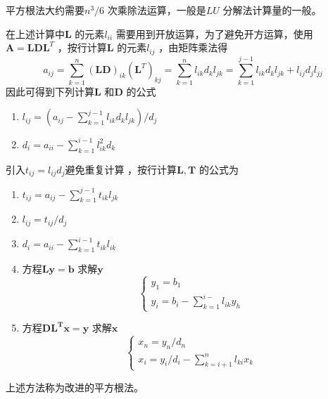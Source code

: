 \documentclass[a4paper]{article}
\begin{document}
平方根法大约需要$n^3 / 6$ 次乘除法运算，一般是$LU$ 分解法计算量的一般。

在上述计算中$\mathbf{L}$ 的元素$l_{ii}$ 需要用到开放运算，为了避免开方运算，使用$\mathbf{A}=\mathbf{LDL}^{T}$ ，按行计算$\mathbf{L}$ 的元素$l_{ij}$ ，由矩阵乘法得
\[
	a_{ij} = \sum_{k=1}^{n} (\mathbf{LD})_{ik} (\mathbf{L}^{T})_{kj} = \sum_{k=1}^{n} l_{ik} d_k l_{jk} = \sum_{k=1}^{j-1} l_{ik} d_k l_{jk} + l_{ij} d_j l_{jj}
\] 
因此可得到下列计算$\mathbf{L}$ 和$\mathbf{D}$ 的公式
\begin{enumerate}
	\item $l_{ij} = (a_{ij} - \sum_{k=1}^{j-1} l_{ik} d_k l_{jk}) / d_j$
	\item $d_i = a_{ii} - \sum_{k=1}^{i-1} l_{ik}^2 d_k$
\end{enumerate}

引入$t_{ij} = l_{ij} d_j$避免重复计算 ，按行计算$\mathbf{L, T}$ 的公式为
\begin{enumerate}
	\item $t_{ij} = a_{ij} - \sum_{k=1}^{j-1} t_{ik} l_{jk}$ 
	\item $l_{ij} = t_{ij} / d_j$
	\item  $d_i = a_{ii} - \sum_{k=1}^{i-1} t_{ik} l_{ik}$ 
	\item 方程$\mathbf{Ly} = \mathbf{b}$ 求解$\mathbf{y}$ 
		\[
		\begin{cases}
			y_1 = b_1 \\
			y_{i} = b_i - \sum_{k=1}^{i-} l_{ik} y_h
		\end{cases} 
		\] 
	\item 方程$\mathbf{DL^{T}x} = \mathbf{y}$ 求解$\mathbf{x}$ 
		\[
			\begin{cases}
				x_{n} = y_{n} / d_n \\
				x_{i} = y_{i} / d_i - \sum_{k=i+1}^{n} l_{ki} x_{k}
			\end{cases} 
		\] 
\end{enumerate}
上述方法称为改进的平方根法。
\end{document}
